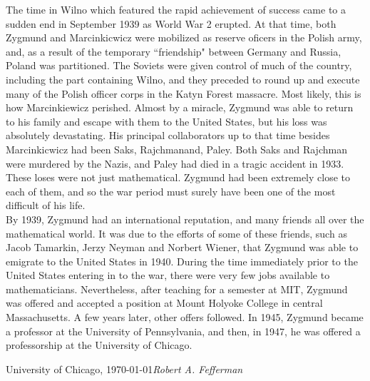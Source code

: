 \indent The time in Wilno which featured the rapid achievement of success came to a sudden end in September 1939 
as World War 2 erupted. At that time, both Zygmund and Marcinkicwicz were mobilized as reserve oficers in 
the Polish army, and, as a result of the temporary ``friendship" between Germany and Russia, Poland was partitioned. 
The Soviets were given control of much of the country, including the part containing Wilno, and they preceded to round up 
and execute many of the Polish officer corps in the Katyn Forest massacre. Most likely, this is how Marcinkiewicz 
perished. Almost by a miracle, Zygmund was able to return to his family and escape with them to the United States, 
but his loss was absolutely devastating. His principal collaborators up to that time besides Marcinkicwicz had 
been Saks, Rajchmanand, Paley. Both Saks and Rajchman were murdered by the Nazis, and Paley had died in a 
tragic accident in 1933. These loses were not just mathematical. Zygmund had been extremely close to each of 
them, and so the war period must surely have been one of the most difficult of his life.\\
\indent By 1939, Zygmund had an international reputation, and many friends all over the mathematical world. It was due 
to the efforts of some of these friends, such as Jacob Tamarkin, Jerzy Neyman and Norbert Wiener, that Zygmund was 
able to emigrate to the United States in 1940. During the time immediately prior to the United States entering 
in to the war, there were very few jobs available to mathematicians. Nevertheless, after teaching for a 
semester at MIT, Zygmund was offered and accepted a position at Mount Holyoke College in central Massachusetts. 
A few years later, other offers followed. In 1945, Zygmund became a professor at the University of Pennsylvania, 
and then, in 1947, he was offered a professorship at the University of Chicago.\\
\indent 





\vspace{\baselineskip}
\begin{flushright}\noindent
University of Chicago, \today \hfill {\it Robert A. Fefferman}\\
\end{flushright}


